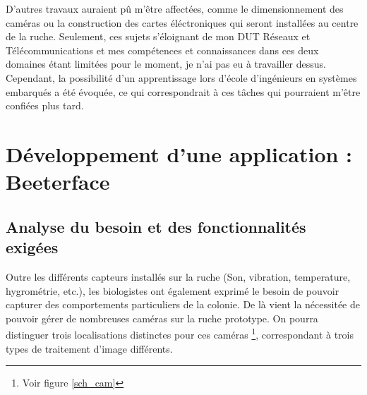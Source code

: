 \documentclass[11pt,french,a4paper]{report}
\begin{document}
D'autres travaux auraient pû m'être affectées, comme le dimensionnement des caméras ou la construction des cartes éléctroniques
qui seront installées au centre de la ruche. Seulement, ces sujets s'éloignant de mon DUT Réseaux et Télécommunications et mes 
compétences et connaissances dans ces deux domaines étant limitées pour le moment, je n'ai pas eu à travailler dessus.\\
Cependant, la possibilité d'un apprentissage lors d'école d'ingénieurs en systèmes embarqués a été évoquée, ce qui correspondrait 
à ces tâches qui pourraient m'être confiées plus tard.


\chapter{Développement d'une application : Beeterface}
    \section{Analyse du besoin et des fonctionnalités exigées}
Outre les différents capteurs installés sur la ruche (Son, vibration, temperature, hygrométrie, etc.), 
les biologistes ont également exprimé le besoin de pouvoir capturer des comportements particuliers de la colonie. 
De là vient la nécessitée de pouvoir gérer de nombreuses caméras sur la ruche prototype. 
On pourra distinguer trois localisations distinctes pour ces caméras \footnote{ Voir figure \ref{sch_cam} }, 
correspondant à trois types de traitement d'image différents. \\
\end{document}
